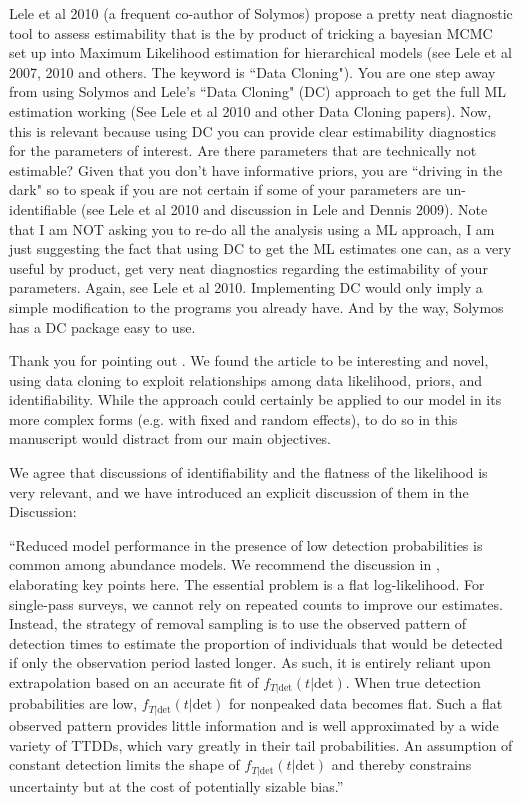\documentclass[12pt]{article}
\renewenvironment{quote}  %
              {\list{}{\rightmargin\leftmargin}\normalfont%
               \item\relax}
              {\endlist}
\newcommand{\dt}{\text{det}}
\newcommand{\ftdt}{f_{T|\dt}(t|\dt)}
\begin{document}
Lele et al 2010 (a frequent co-author of Solymos) propose a pretty neat diagnostic tool to assess
estimability that is the by product of tricking a bayesian MCMC set up into Maximum Likelihood estimation for hierarchical models (see Lele et al 2007, 2010 and others. The keyword is ``Data Cloning"). You are one step away from using Solymos and Lele's ``Data Cloning" (DC) approach to get the full ML estimation working (See Lele et al 2010 and other Data Cloning papers). Now, this is relevant because using DC you can provide clear estimability diagnostics for the parameters of interest.  Are there parameters that are technically not estimable?  Given that you don't have informative priors, you are ``driving in the dark" so to speak if you are not certain if some of your parameters are un-identifiable (see Lele et al 2010 and discussion in Lele and Dennis 2009).  Note that I am NOT asking you to re-do all the analysis using a ML approach, I am just suggesting the fact that using DC to get the ML estimates one can, as a very useful by product, get very neat diagnostics regarding
the estimability of your parameters.  Again, see Lele et al 2010.  Implementing DC would only imply a simple modification to the programs you already have. And by the way, Solymos has a DC package easy to use.
\begin{quote}
Thank you for pointing out \citet{Lele2010}.
We found the article to be interesting and novel, using data cloning to exploit relationships among data likelihood, priors, and identifiability.
While the approach could certainly be applied to our model in its more complex forms (e.g. with fixed and random effects), to do so in this manuscript would distract from our main objectives.

We agree that discussions of identifiability and the flatness of the likelihood is very relevant, and we have introduced an explicit discussion of them in the Discussion:

``Reduced model performance in the presence of low detection probabilities is common among abundance models.
We recommend the discussion in \citet{CoullAgresti1999}, elaborating key points here.
The essential problem is a flat log-likelihood.
For single-pass surveys, we cannot rely on repeated counts to improve our estimates.
Instead, the strategy of removal sampling is to use the observed pattern of detection times to estimate the proportion of individuals that would be detected if only the observation period lasted longer.  
As such, it is entirely reliant upon extrapolation based on an accurate fit of $\ftdt$.
When true detection probabilities are low, $\ftdt$ for nonpeaked data becomes flat.
Such a flat observed pattern provides little information and is well approximated by a wide variety of TTDDs, which vary greatly in their tail probabilities.
An assumption of constant detection limits the shape of $\ftdt$ and thereby constrains uncertainty but at the cost of potentially sizable bias.''
\end{quote}
\end{document}
